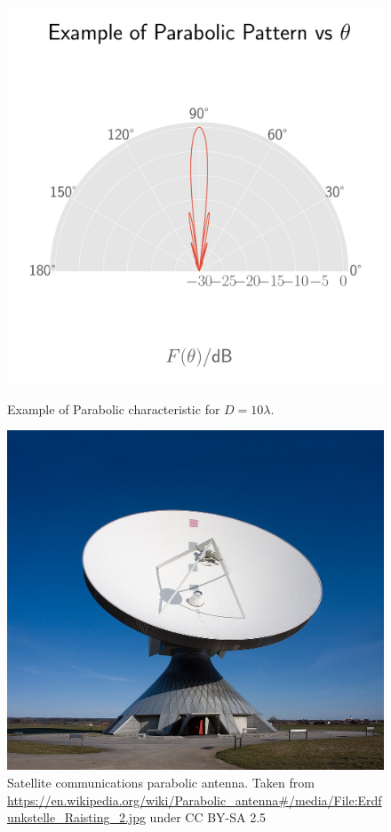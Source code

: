 \documentclass[10pt, a4paper]{article}
\begin{document}
\begin{figure}[H]
  \begin{minipage}[t]{0.45\textwidth}
    \centering
    \includegraphics[width=\textwidth]{graphics/parabolic_theta.pdf}
    \caption{Example of Parabolic characteristic for $D=10\lambda$.}
  \end{minipage}\hfill
  \begin{minipage}[t]{0.45\textwidth}
    \centering
    \includegraphics[width=\textwidth]{graphics/parab.jpg}
    \caption{Satellite communications parabolic antenna. Taken from \url{https://en.wikipedia.org/wiki/Parabolic_antenna\#/media/File:Erdfunkstelle_Raisting_2.jpg} under CC BY-SA 2.5}
   \end{minipage}
\end{figure}
\end{document}
